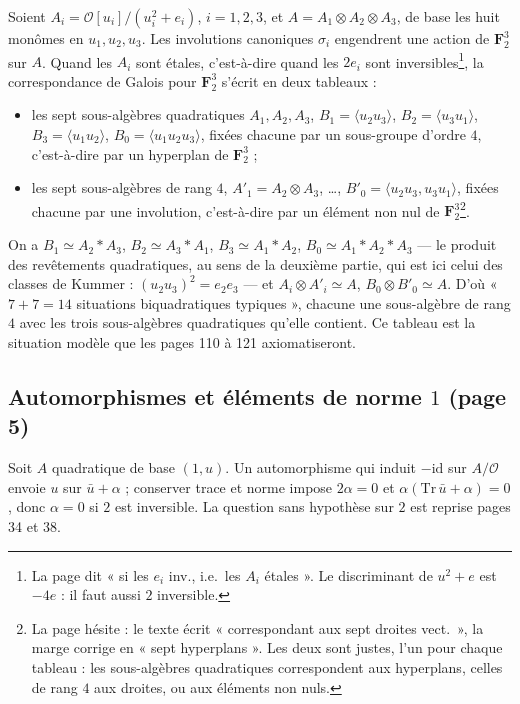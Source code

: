 \documentclass[11pt,a4paper]{article}
\begin{document}
Soient $A_i = \mathcal{O}[u_i]/(u_i^{2} + e_i)$, $i = 1, 2, 3$, et
$A = A_1 \otimes A_2 \otimes A_3$, de base les huit monômes en $u_1, u_2, u_3$. Les
involutions canoniques $\sigma_i$ engendrent une action de $\mathbf{F}_2^{3}$ sur
$A$. Quand les $A_i$ sont étales, c'est-à-dire quand les $2e_i$ sont
inversibles\footnote{La page dit « si les $e_i$ inv., i.e.\ les $A_i$ étales ». Le
discriminant de $u^{2} + e$ est $-4e$ : il faut aussi $2$ inversible.}, la
correspondance de Galois pour $\mathbf{F}_2^{3}$ s'écrit en deux tableaux :
\begin{itemize}
\item les sept sous-algèbres quadratiques $A_1, A_2, A_3$, $B_1 = \langle u_2u_3\rangle$,
$B_2 = \langle u_3u_1\rangle$, $B_3 = \langle u_1u_2\rangle$, $B_0 = \langle u_1u_2u_3\rangle$,
fixées chacune par un sous-groupe d'ordre $4$, c'est-à-dire par un hyperplan de
$\mathbf{F}_2^{3}$ ;
\item les sept sous-algèbres de rang $4$, $A'_1 = A_2 \otimes A_3$, \ldots,
$B'_0 = \langle u_2u_3, u_3u_1\rangle$, fixées chacune par une involution, c'est-à-dire
par un élément non nul de $\mathbf{F}_2^{3}$\footnote{La page hésite : le texte
écrit « correspondant aux sept droites vect.\ », la marge corrige en « sept
hyperplans ». Les deux sont justes, l'un pour chaque tableau : les sous-algèbres
quadratiques correspondent aux hyperplans, celles de rang $4$ aux droites, ou aux
éléments non nuls.}.
\end{itemize}
On a $B_1 \simeq A_2 * A_3$, $B_2 \simeq A_3 * A_1$, $B_3 \simeq A_1 * A_2$,
$B_0 \simeq A_1 * A_2 * A_3$ --- le produit des revêtements quadratiques, au sens
de la deuxième partie, qui est ici celui des classes de Kummer :
$(u_2u_3)^{2} = e_2e_3$ --- et $A_i \otimes A'_i \simeq A$, $B_0 \otimes B'_0 \simeq A$. D'où
« $7 + 7 = 14$ situations biquadratiques typiques », chacune une sous-algèbre de
rang $4$ avec les trois sous-algèbres quadratiques qu'elle contient. Ce tableau
est la situation modèle que les pages 110 à 121 axiomatiseront.

\subsection*{Automorphismes et éléments de norme $1$ (page 5)}

Soit $A$ quadratique de base $(1, u)$. Un automorphisme qui induit $-\mathrm{id}$
sur $A/\mathcal{O}$ envoie $u$ sur $\bar{u} + \alpha$ ; conserver trace et norme
impose $2\alpha = 0$ et $\alpha(\mathrm{Tr}\,\bar{u} + \alpha) = 0$, donc $\alpha = 0$ si
$2$ est inversible. La question sans hypothèse sur $2$ est reprise pages 34 et
38.
\end{document}
